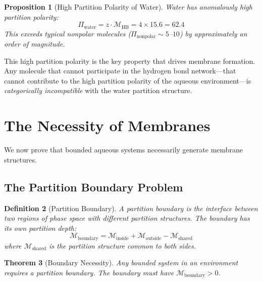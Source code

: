 \documentclass[twocolumn,10pt]{article}
\newtheorem{theorem}{Theorem}[section]
\newtheorem{proposition}[theorem]{Proposition}
\newtheorem{definition}[theorem]{Definition}
\theoremstyle{remark}
\newcommand{\Depth}{\mathcal{M}}
\begin{document}
\begin{proposition}[High Partition Polarity of Water]
\label{prop:water_polarity}
Water has anomalously high partition polarity:
\begin{equation}
    \Pi_{\text{water}} = z \cdot \Depth_{\text{HB}} = 4 \times 15.6 = 62.4
\end{equation}
This exceeds typical nonpolar molecules ($\Pi_{\text{nonpolar}} \sim 5$--$10$) by approximately an order of magnitude.
\end{proposition}

This high partition polarity is the key property that drives membrane formation. Any molecule that cannot participate in the hydrogen bond network---that cannot contribute to the high partition polarity of the aqueous environment---is \emph{categorically incompatible} with the water partition structure.

\section{The Necessity of Membranes}
\label{sec:necessity}

We now prove that bounded aqueous systems necessarily generate membrane structures.

\subsection{The Partition Boundary Problem}

\begin{definition}[Partition Boundary]
\label{def:boundary}
A \emph{partition boundary} is the interface between two regions of phase space with different partition structures. The boundary has its own partition depth:
\begin{equation}
    \Depth_{\text{boundary}} = \Depth_{\text{inside}} + \Depth_{\text{outside}} - \Depth_{\text{shared}}
\end{equation}
where $\Depth_{\text{shared}}$ is the partition structure common to both sides.
\end{definition}

\begin{theorem}[Boundary Necessity]
\label{thm:boundary_necessity}
Any bounded system in an environment requires a partition boundary. The boundary must have $\Depth_{\text{boundary}} > 0$.
\end{theorem}
\end{document}
